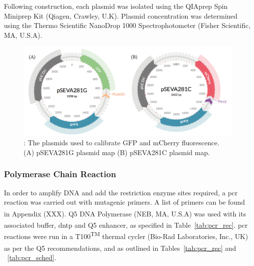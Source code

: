 Following construction, each plasmid was isolated using the QIAprep Spin Miniprep Kit (Qiagen, Crawley, U.K). Plasmid concentration was determined using the Thermo Scientific NanoDrop 1000 Spectrophotometer (Fisher Scientific, MA, U.S.A).

\begin{figure}[t]
	\begin{center}
		\includegraphics[width=\textwidth]{../../chapters/chapterABCFlow/images/plasmids_constructed.png}
		\caption[LoF caption]{\label{fig:psevas}: The plasmids used to calibrate GFP and mCherry fluorescence. (A) pSEVA281G plasmid map (B) pSEVA281C plasmid map.  }
	\end{center}
\end{figure}

\subsubsection{Polymerase Chain Reaction}
\label{sec:pcr}
In order to amplify DNA and add the restriction enzyme sites required, a \acrfull{pcr} reaction was carried out with mutagenic primers. A list of primers can be found in Appendix (XXX). Q5\textsuperscript{\textregistered} DNA Polymerase (NEB, MA, U.S.A) was used with its associated buffer, \acrshort{dntp} and Q5\textsuperscript{\textregistered} enhancer, as specified in Table~\ref{tab:pcr_rec}. \acrshort{pcr} reactions were run in a T100\textsuperscript{TM} thermal cycler (Bio-Rad Laboratories, Inc., UK) as per the Q5\textsuperscript{\textregistered} recommendations, and as outlined in Tables~\ref{tab:pcr_rec} and ~\ref{tab:pcr_sched}.

